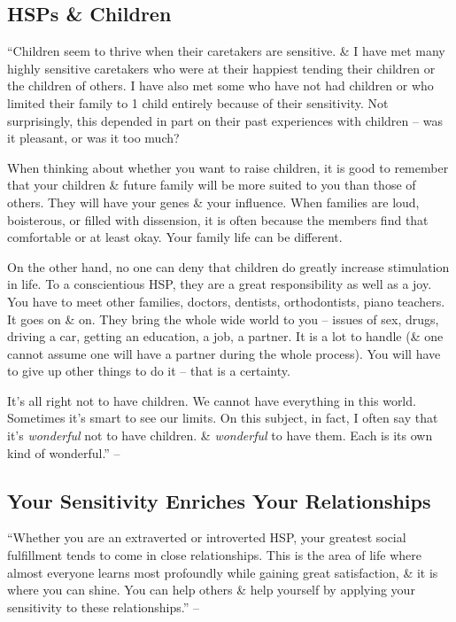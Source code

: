 \documentclass{article}
\numberwithin{equation}{section}
\begin{document}
\subsection{HSPs \& Children}
``Children seem to thrive when their caretakers are sensitive. \& I have met many highly sensitive caretakers who were at their happiest tending their children or the children of others. I have also met some who have not had children or who limited their family to 1 child entirely because of their sensitivity. Not surprisingly, this depended in part on their past experiences with children -- was it pleasant, or was it too much?

When thinking about whether you want to raise children, it is good to remember that your children \& future family will be more suited to you than those of others. They will have your genes \& your influence. When families are loud, boisterous, or filled with dissension, it is often because the members find that comfortable or at least okay. Your family life can be different.

On the other hand, no one can deny that children do greatly increase stimulation in life. To a conscientious HSP, they are a great responsibility as well as a joy. You have to meet other families, doctors, dentists, orthodontists, piano teachers. It goes on \& on. They bring the whole wide world to you -- issues of sex, drugs, driving a car, getting an education, a job, a partner. It is a lot to handle (\& one cannot assume one will have a partner during the whole process). You will have to give up other things to do it -- that is a certainty.

It's all right not to have children. We cannot have everything in this world. Sometimes it's smart to see our limits. On this subject, in fact, I often say that it's \textit{wonderful} not to have children. \& \textit{wonderful} to have them. Each is its own kind of wonderful.'' -- \cite[p. 195]{Aron2013}

\subsection{Your Sensitivity Enriches Your Relationships}
``Whether you are an extraverted or introverted HSP, your greatest social fulfillment tends to come in close relationships. This is the area of life where almost everyone learns most profoundly while gaining great satisfaction, \& it is where you can shine. You can help others \& help yourself by applying your sensitivity to these relationships.'' -- \cite[p. 196]{Aron2013}
\end{document}
